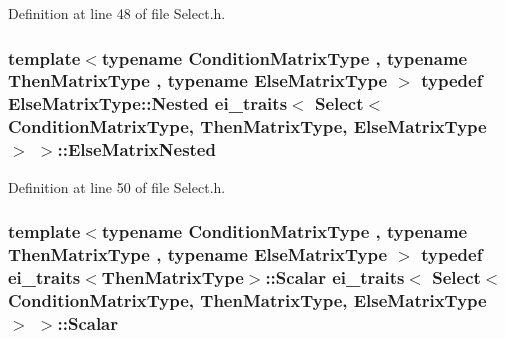Definition at line 48 of file Select.\-h.

\hypertarget{structei__traits_3_01_select_3_01_condition_matrix_type_00_01_then_matrix_type_00_01_else_matrix_type_01_4_01_4_a8f7b39218bee4b8e2b5654fee0ece385}{
\subsubsection[{Else\-Matrix\-Nested}]{\setlength{\rightskip}{0pt plus 5cm}template$<$typename Condition\-Matrix\-Type , typename Then\-Matrix\-Type , typename Else\-Matrix\-Type $>$ typedef Else\-Matrix\-Type\-::\-Nested {\bf ei\-\_\-traits}$<$ {\bf Select}$<$ Condition\-Matrix\-Type, Then\-Matrix\-Type, Else\-Matrix\-Type $>$ $>$\-::{\bf Else\-Matrix\-Nested}}}\label{structei__traits_3_01_select_3_01_condition_matrix_type_00_01_then_matrix_type_00_01_else_matrix_type_01_4_01_4_a8f7b39218bee4b8e2b5654fee0ece385}


Definition at line 50 of file Select.\-h.

\hypertarget{structei__traits_3_01_select_3_01_condition_matrix_type_00_01_then_matrix_type_00_01_else_matrix_type_01_4_01_4_a70e3e22378bef648a471e7ed33aedaf2}{
\subsubsection[{Scalar}]{\setlength{\rightskip}{0pt plus 5cm}template$<$typename Condition\-Matrix\-Type , typename Then\-Matrix\-Type , typename Else\-Matrix\-Type $>$ typedef {\bf ei\-\_\-traits}$<$Then\-Matrix\-Type$>$\-::{\bf Scalar} {\bf ei\-\_\-traits}$<$ {\bf Select}$<$ Condition\-Matrix\-Type, Then\-Matrix\-Type, Else\-Matrix\-Type $>$ $>$\-::{\bf Scalar}}}\label{structei__traits_3_01_select_3_01_condition_matrix_type_00_01_then_matrix_type_00_01_else_matrix_type_01_4_01_4_a70e3e22378bef648a471e7ed33aedaf2}


